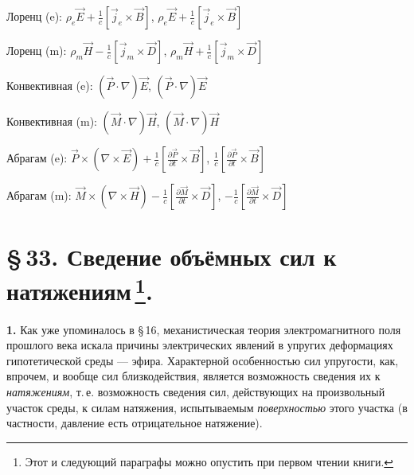 \documentclass[a4paper,10pt]{article}
\newcommand{\modblock}[1]{\colorbox{modcolor!10}{\parbox{\dimexpr\linewidth-2\fboxsep}{#1}}}
\begin{document}
\modblock{


Лоренц (e): $\rho_e\vec{E} + \frac{1}{c}[\vec{j}_e\times\vec{B}]$, $\rho_e\vec{E} + \frac{1}{c}[\vec{j}_e\times\vec{B}]$

Лоренц (m): $\rho_m\vec{H} - \frac{1}{c}[\vec{j}_m\times\vec{D}]$, $\rho_m\vec{H} + \frac{1}{c}[\vec{j}_m\times\vec{D}]$

Конвективная (e): $(\vec{P}\cdot\nabla)\vec{E}$, $(\vec{P}\cdot\nabla)\vec{E}$

Конвективная (m): $(\vec{M}\cdot\nabla)\vec{H}$, $(\vec{M}\cdot\nabla)\vec{H}$

Абрагам (e): $\vec{P}\times(\nabla\times\vec{E}) + \frac{1}{c}\left[\frac{\partial\vec{P}}{\partial t}\times\vec{B}\right]$, $\frac{1}{c}\left[\frac{\partial\vec{P}}{\partial t}\times\vec{B}\right]$

Абрагам (m): $\vec{M}\times(\nabla\times\vec{H}) - \frac{1}{c}\left[\frac{\partial\vec{M}}{\partial t}\times\vec{D}\right]$, $-\frac{1}{c}\left[\frac{\partial\vec{M}}{\partial t}\times\vec{D}\right]$



}%

\section*{\S\,33. Сведение объёмных сил к натяжениям\,\footnote{Этот
и следующий параграфы можно опустить при первом чтении книги.}.}

\textbf{1.} Как уже упоминалось в §\,16, механистическая теория
электромагнитного поля прошлого века искала причины электрических
явлений в упругих деформациях гипотетической среды — эфира.
Характерной особенностью сил упругости, как, впрочем, и вообще сил
близкодействия, является возможность сведения их к \textit{натяжениям},
т.\,е. возможность сведения сил, действующих на произвольный участок
среды, к силам натяжения, испытываемым \textit{поверхностью} этого
участка (в частности, давление есть отрицательное натяжение).
\end{document}
